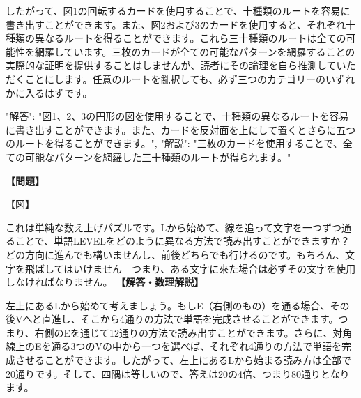 \documentclass[10pt,a4paper,oneside,openany]{ltjsbook}
\begin{document}
\begin{tcolorbox}[colback=softblue,colframe=primaryblue,title=\textbf{第 254 問：THE MOTOR-CAR TOUR.},arc=2mm,boxrule=1pt,breakable]
したがって、図1の回転するカードを使用することで、十種類のルートを容易に書き出すことができます。また、図2および3のカードを使用すると、それぞれ十種類の異なるルートを得ることができます。これら三十種類のルートは全ての可能性を網羅しています。三枚のカードが全ての可能なパターンを網羅することの実際的な証明を提供することはしませんが、読者にその論理を自ら推測していただくことにします。任意のルートを亂択しても、必ず三つのカテゴリーのいずれかに入るはずです。

{
  "解答": "図1、2、3の円形の図を使用することで、十種類の異なるルートを容易に書き出すことができます。また、カードを反対面を上にして置くとさらに五つのルートを得ることができます。",
  "解説": "三枚のカードを使用することで、全ての可能なパターンを網羅した三十種類のルートが得られます。"
}
\end{tcolorbox}

\begin{tcolorbox}[colback=softblue,colframe=primaryblue,title=\textbf{第 255 問：レベルのパズル （原題: THE LEVEL PUZZLE.）},arc=2mm,boxrule=1pt,breakable]
\textbf{【問題】}\par\vspace{0.3em}
【図】

これは単純な数え上げパズルです。Lから始めて、線を追って文字を一つずつ通ることで、単語LEVELをどのように異なる方法で読み出すことができますか？どの方向に進んでも構いませんし、前後どちらでも行けるのです。もちろん、文字を飛ばしてはいけません—つまり、ある文字に來た場合は必ずその文字を使用しなければなりません。
\tcblower
\textbf{【解答・数理解説】}\par\vspace{0.3em}
左上にあるLから始めて考えましょう。もしE（右側のもの）を通る場合、その後Vへと直進し、そこから4通りの方法で単語を完成させることができます。つまり、右側のEを通じて12通りの方法で読み出すことができます。さらに、対角線上のEを通る3つのVの中から一つを選べば、それぞれ4通りの方法で単語を完成させることができます。したがって、左上にあるLから始まる読み方は全部で20通りです。そして、四隅は等しいので、答えは20の4倍、つまり80通りとなります。
\end{tcolorbox}
\end{document}
